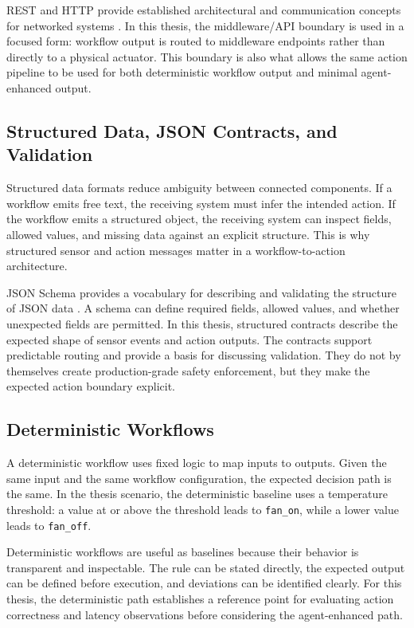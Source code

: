 REST and HTTP provide established architectural and communication concepts for networked systems \cite{fieldingRest2000,httpSemanticsRfc9110}. In this thesis, the middleware/API boundary is used in a focused form: workflow output is routed to middleware endpoints rather than directly to a physical actuator. This boundary is also what allows the same action pipeline to be used for both deterministic workflow output and minimal agent-enhanced output.

\subsection{Structured Data, JSON Contracts, and Validation}\label{subsec:json-contracts}

Structured data formats reduce ambiguity between connected components. If a workflow emits free text, the receiving system must infer the intended action. If the workflow emits a structured object, the receiving system can inspect fields, allowed values, and missing data against an explicit structure. This is why structured sensor and action messages matter in a workflow-to-action architecture.

JSON Schema provides a vocabulary for describing and validating the structure of JSON data \cite{jsonSchemaDocs}. A schema can define required fields, allowed values, and whether unexpected fields are permitted. In this thesis, structured contracts describe the expected shape of sensor events and action outputs. The contracts support predictable routing and provide a basis for discussing validation. They do not by themselves create production-grade safety enforcement, but they make the expected action boundary explicit.

\subsection{Deterministic Workflows}\label{subsec:deterministic-workflows}

A deterministic workflow uses fixed logic to map inputs to outputs. Given the same input and the same workflow configuration, the expected decision path is the same. In the thesis scenario, the deterministic baseline uses a temperature threshold: a value at or above the threshold leads to \texttt{fan\_on}, while a lower value leads to \texttt{fan\_off}.

Deterministic workflows are useful as baselines because their behavior is transparent and inspectable. The rule can be stated directly, the expected output can be defined before execution, and deviations can be identified clearly. For this thesis, the deterministic path establishes a reference point for evaluating action correctness and latency observations before considering the agent-enhanced path.

